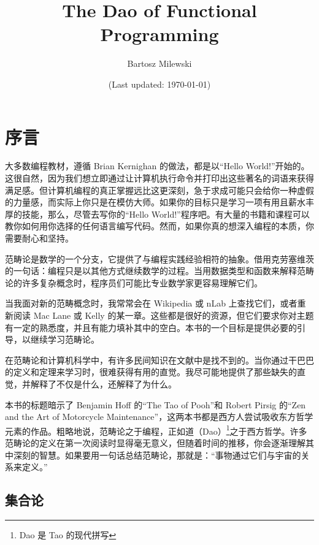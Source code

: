 \documentclass[11pt, book]{memoir}
\begin{document}
  \setcounter{tocdepth}{4}
  \setcounter{secnumdepth}{4}
  \frontmatter

  \title{\huge The Dao of Functional Programming}
  \author{\Large Bartosz Milewski }

  \date{\vfill (Last updated: \today)}

  \maketitle

  \tableofcontents*

  \clearpage

  \section{序言}

  大多数编程教材，遵循 Brian Kernighan 的做法，都是以``Hello World!''开始的。这很自然，因为我们想立即通过让计算机执行命令并打印出这些著名的词语来获得满足感。但计算机编程的真正掌握远比这更深刻，急于求成可能只会给你一种虚假的力量感，而实际上你只是在模仿大师。如果你的目标只是学习一项有用且薪水丰厚的技能，那么，尽管去写你的``Hello World!''程序吧。有大量的书籍和课程可以教你如何用你选择的任何语言编写代码。然而，如果你真的想深入编程的本质，你需要耐心和坚持。

  范畴论是数学的一个分支，它提供了与编程实践经验相符的抽象。借用克劳塞维茨的一句话：编程只是以其他方式继续数学的过程。当用数据类型和函数来解释范畴论的许多复杂概念时，程序员们可能比专业数学家更容易理解它们。

  当我面对新的范畴概念时，我常常会在 Wikipedia 或 nLab 上查找它们，或者重新阅读 Mac Lane 或 Kelly 的某一章。这些都是很好的资源，但它们要求你对主题有一定的熟悉度，并且有能力填补其中的空白。本书的一个目标是提供必要的引导，以继续学习范畴论。

  在范畴论和计算机科学中，有许多民间知识在文献中是找不到的。当你通过干巴巴的定义和定理来学习时，很难获得有用的直觉。我尽可能地提供了那些缺失的直觉，并解释了不仅是什么，还解释了为什么。

  本书的标题暗示了 Benjamin Hoff 的``The Tao of Pooh''和 Robert Pirsig 的``Zen and the Art of Motorcycle Maintenance''，这两本书都是西方人尝试吸收东方哲学元素的作品。粗略地说，范畴论之于编程，正如道（Dao）\footnote{Dao 是 Tao 的现代拼写}之于西方哲学。许多范畴论的定义在第一次阅读时显得毫无意义，但随着时间的推移，你会逐渐理解其中深刻的智慧。如果要用一句话总结范畴论，那就是：``事物通过它们与宇宙的关系来定义。''

  \subsection{集合论}
\end{document}
